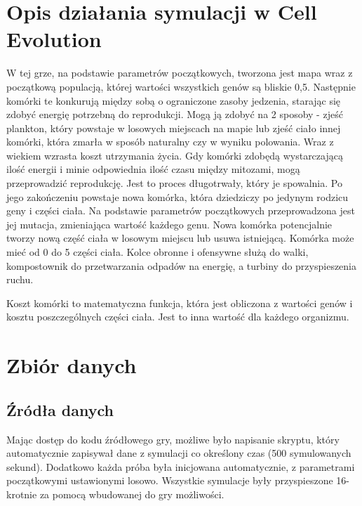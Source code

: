\documentclass{article}
\begin{document}
\section{Opis działania symulacji w Cell Evolution}
W tej grze, na podstawie parametrów początkowych, tworzona jest mapa wraz z początkową populacją, której wartości wszystkich genów są bliskie 0,5. Następnie komórki te konkurują między sobą o ograniczone zasoby jedzenia, starając się zdobyć energię potrzebną do reprodukcji. Mogą ją zdobyć na 2 sposoby - zjeść plankton, który powstaje w losowych miejscach na mapie lub zjeść ciało innej komórki, która zmarła w sposób naturalny czy w wyniku polowania. Wraz z wiekiem wzrasta koszt utrzymania życia. Gdy komórki zdobędą wystarczającą ilość energii i minie odpowiednia ilość czasu między mitozami, mogą przeprowadzić reprodukcję. Jest to proces długotrwały, który je spowalnia. Po jego zakończeniu powstaje nowa komórka, która dziedziczy po jedynym rodzicu geny i części ciała. Na podstawie parametrów początkowych przeprowadzona jest jej mutacja, zmieniająca wartość każdego genu. Nowa komórka potencjalnie tworzy nową część ciała w losowym miejscu lub usuwa istniejącą. Komórka może mieć od 0 do 5 części ciała. Kolce obronne i ofensywne służą do walki, kompostownik do przetwarzania odpadów na energię, a turbiny do przyspieszenia ruchu. 

Koszt komórki to matematyczna funkcja, która jest obliczona z wartości genów i kosztu poszczególnych części ciała. Jest to inna wartość dla każdego organizmu.

\section{Zbiór danych}
\subsection{Źródła danych}
Mając dostęp do kodu źródłowego gry, możliwe było napisanie skryptu, który automatycznie zapisywał dane z symulacji co określony czas (500 symulowanych sekund). Dodatkowo każda próba była inicjowana automatycznie, z parametrami początkowymi ustawionymi losowo. Wszystkie symulacje były przyspieszone 16-krotnie za pomocą wbudowanej do gry możliwości. 
\end{document}
